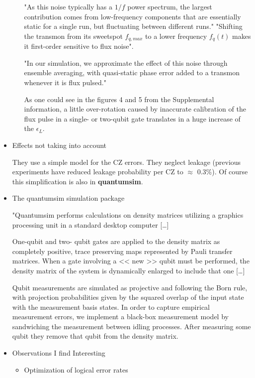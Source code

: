 \begin{itemize}
\begin{itemize}
"As this noise typically has a \(1/f\) power spectrum, the largest contribution comes from low-frequency components that are essentially static for a single run, but fluctuating between different runs."
"Shifting the transmon from its sweetspot \(f_{q,max}\) to a lower frequency \(f_q (t)\) makes it first-order sensitive to flux noise".

"In our simulation, we approximate the effect of this noise through ensemble averaging, with quasi-static phase error added to a transmon whenever it is flux pulsed."

As one could see in the figures 4 and 5 from the Supplemental information, a little over-rotation  caused by inaccurate calibration of the flux pulse in a single- or two-qubit gate translates in a huge increase of the \(\epsilon_L\).
\end{itemize}


\item Effects not taking into account
\label{sec:org2953be7}

They use a simple model for the CZ errors.
They neglect leakage (previous experiments have reduced leakage probability per CZ to \(\approx\) 0.3\%).
Of course this simplification is also in \textbf{quantumsim}.

\item The quantumsim simulation package
\label{sec:org131ae2a}

"Quantumsim performs calculations on density matrices utilizing a graphics processing unit in a standard desktop computer [\ldots{}]

One-qubit and two- qubit gates are applied to the density matrix as completely positive, trace preserving maps represented by Pauli transfer matrices. When a gate involving a << new >> qubit must be performed, the density matrix of the system is dynamically enlarged to include that one [\ldots{}]

Qubit measurements are simulated as projective and following the Born rule, with projection probabilities given by the squared overlap of the input state with the measurement basis states. In order to capture empirical measurement errors, we implement a black-box measurement model by sandwiching the measurement between idling processes. After measuring some qubit they remove that qubit from the density matrix.


\item Observations I find Interesting
\label{sec:orgbd69322}
\begin{itemize}
\item Optimization of logical error rates
\label{sec:org5bc6b85}


\end{itemize}
\end{itemize}
